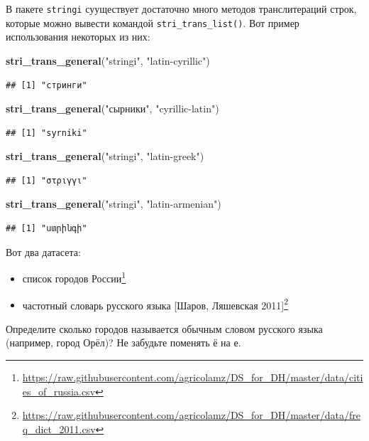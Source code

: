 \documentclass[
]{book}
\makeatletter
\newenvironment{Shaded}{\begin{snugshade}}{\end{snugshade}}
\newcommand{\KeywordTok}[1]{\textcolor[rgb]{0.13,0.29,0.53}{\textbf{#1}}}
\newcommand{\NormalTok}[1]{#1}
\newcommand{\StringTok}[1]{\textcolor[rgb]{0.31,0.60,0.02}{#1}}
\providecommand{\tightlist}{%
  \setlength{\itemsep}{0pt}\setlength{\parskip}{0pt}}
\renewcommand{\href}[2]{#2\footnote{\url{#1}}}
\newenvironment{kframe}{%
    \medskip{}
    \setlength{\fboxsep}{.8em}
    \def\at@end@of@kframe{}%
    \ifinner\ifhmode%
    \def\at@end@of@kframe{\end{minipage}}%
    \begin{minipage}{\columnwidth}%
    \fi\fi%
    \def\FrameCommand##1{\hskip\@totalleftmargin \hskip-\fboxsep
    \colorbox{shadecolor}{##1}\hskip-\fboxsep
        \hskip-\linewidth \hskip-\@totalleftmargin \hskip\columnwidth}%
    \MakeFramed {\advance\hsize-\width
      \@totalleftmargin\z@ \linewidth\hsize
      \@setminipage}}%
  {\par\unskip\endMakeFramed%
    \at@end@of@kframe}
\newenvironment{rmdblock}[1]
  {
    \begin{itemize}
    \renewcommand{\labelitemi}{
      \raisebox{-.7\height}[0pt][0pt]{
        {\setkeys{Gin}{width=3em,keepaspectratio}\texttt{[image: images/\#1]}}
        }
        }
        \setlength{\fboxsep}{1em}
        \begin{kframe}
        \item
      }
      {
        \end{kframe}
        \end{itemize}
      }
\newenvironment{rmdtask}
      {\begin{rmdblock}{task}}
      {\end{rmdblock}}
\makeatother
\begin{document}
В пакете \texttt{stringi} сууществует достаточно много методов транслитераций строк, которые можно вывести командой \texttt{stri\_trans\_list()}. Вот пример использования некоторых из них:

\begin{Shaded}
\begin{Highlighting}[]
\KeywordTok{stri_trans_general}\NormalTok{(}\StringTok{"stringi"}\NormalTok{, }\StringTok{"latin-cyrillic"}\NormalTok{)}
\end{Highlighting}
\end{Shaded}

\begin{verbatim}
## [1] "стринги"
\end{verbatim}

\begin{Shaded}
\begin{Highlighting}[]
\KeywordTok{stri_trans_general}\NormalTok{(}\StringTok{"сырники"}\NormalTok{, }\StringTok{"cyrillic-latin"}\NormalTok{)}
\end{Highlighting}
\end{Shaded}

\begin{verbatim}
## [1] "syrniki"
\end{verbatim}

\begin{Shaded}
\begin{Highlighting}[]
\KeywordTok{stri_trans_general}\NormalTok{(}\StringTok{"stringi"}\NormalTok{, }\StringTok{"latin-greek"}\NormalTok{)}
\end{Highlighting}
\end{Shaded}

\begin{verbatim}
## [1] "στριγγι"
\end{verbatim}

\begin{Shaded}
\begin{Highlighting}[]
\KeywordTok{stri_trans_general}\NormalTok{(}\StringTok{"stringi"}\NormalTok{, }\StringTok{"latin-armenian"}\NormalTok{)}
\end{Highlighting}
\end{Shaded}

\begin{verbatim}
## [1] "ստրինգի"
\end{verbatim}

\begin{rmdtask}
Вот два датасета:

\begin{itemize}
\tightlist
\item
  \href{https://raw.githubusercontent.com/agricolamz/DS_for_DH/master/data/cities_of_russia.csv}{список
  городов России}
\item
  \href{https://raw.githubusercontent.com/agricolamz/DS_for_DH/master/data/freq_dict_2011.csv}{частотный
  словарь русского языка {[}Шаров, Ляшевская 2011{]}}
\end{itemize}

Определите сколько городов называется обычным словом русского языка
(например, город Орёл)? Не забудьте поменять ё на е.
\end{rmdtask}
\end{document}
